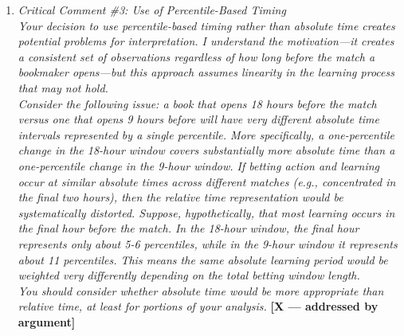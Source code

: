 \documentclass[letterpaper,12pt]{article}
\newcounter{b}
\newcommand{\argX}{\textcolor{green!55!black}{\textbf{[X --- addressed by argument]}}}
\newcommand{\Reply}[1]{\par\noindent\textbf{Reply:} #1}
\begin{document}
\begin{enumerate}

\item \textit{Critical Comment \#3: Use of Percentile-Based Timing\\[6pt]
Your decision to use percentile-based timing rather than absolute time creates potential problems for interpretation. I understand the motivation—it creates a consistent set of observations regardless of how long before the match a bookmaker opens—but this approach assumes linearity in the learning process that may not hold.\\[6pt]
Consider the following issue: a book that opens 18 hours before the match versus one that opens 9 hours before will have very different absolute time intervals represented by a single percentile. More specifically, a one-percentile change in the 18-hour window covers substantially more absolute time than a one-percentile change in the 9-hour window. If betting action and learning occur at similar absolute times across different matches (e.g., concentrated in the final two hours), then the relative time representation would be systematically distorted. Suppose, hypothetically, that most learning occurs in the final hour before the match. In the 18-hour window, the final hour represents only about 5-6 percentiles, while in the 9-hour window it represents about 11 percentiles. This means the same absolute learning period would be weighted very differently depending on the total betting window length.\\[6pt]
You should consider whether absolute time would be more appropriate than relative time, at least for portions of your analysis.} \argX


\end{enumerate}
\end{document}
